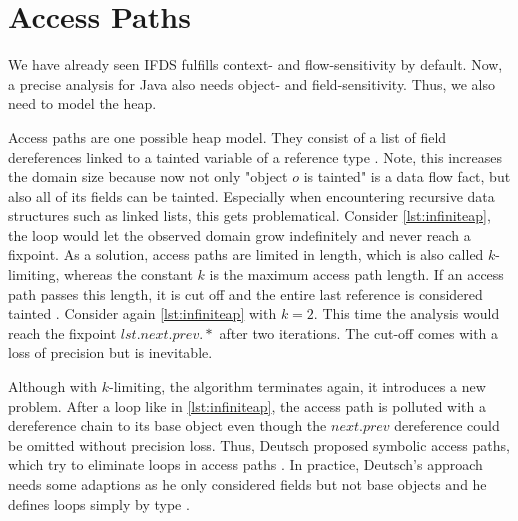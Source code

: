 \documentclass[../draft.tex]{subfiles}
\begin{document}
    \section{Access Paths}\label{s:ap}
    We have already seen IFDS fulfills context- and flow-sensitivity by default. Now, a precise analysis for Java also needs object- and field-sensitivity. Thus, we also need to model the heap. 

    Access paths are one possible heap model. They consist of a list of field dereferences linked to a tainted variable of a reference type \cite{Khedker2009}. Note, this increases the domain size because now not only "object $o$ is tainted" is a data flow fact, but also all of its fields can be tainted. Especially when encountering recursive data structures such as linked lists, this gets problematical. Consider \autoref{lst:infiniteap}, the loop would let the observed domain grow indefinitely and never reach a fixpoint.
    As a solution, access paths are limited in length, which is also called $k$-limiting, whereas the constant $k$ is the maximum access path length. If an access path passes this length, it is cut off and the entire last reference is considered tainted \cite{Jones1979}. Consider again \autoref{lst:infiniteap} with $k=2$. This time the analysis would reach the fixpoint $lst.next.prev.*$ after two iterations.
    The cut-off comes with a loss of precision but is inevitable.

    Although with $k$-limiting, the algorithm terminates again, it introduces a new problem. After a loop like in \autoref{lst:infiniteap}, the access path is polluted with a dereference chain to its base object even though the $next.prev$ dereference could be omitted without precision loss. Thus, Deutsch proposed symbolic access paths, which try to eliminate loops in access paths \cite{Deutsch1994}. In practice, Deutsch's approach needs some adaptions as he only considered fields but not base objects and he defines loops simply by type \cite{Arzt2017PhD}. 
\end{document}
